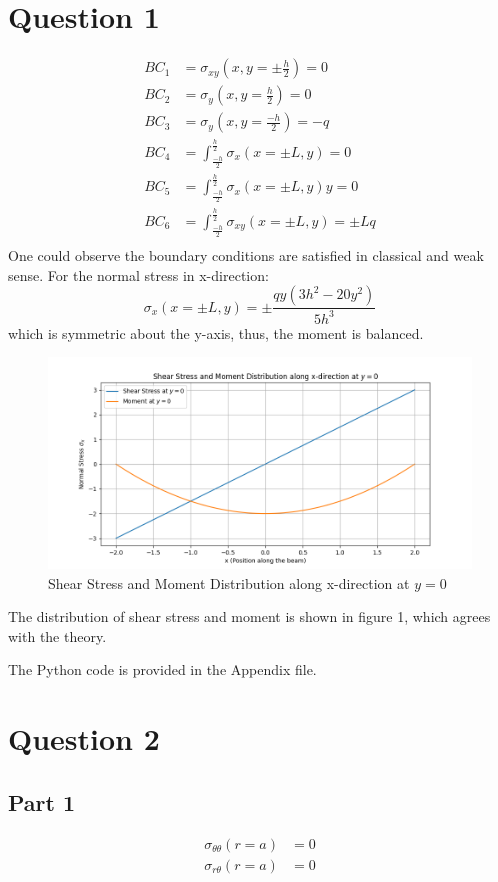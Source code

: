 \documentclass[12pt]{article} %
\begin{document}
\section{Question 1}
\begin{align*}
    BC_1 &= \sigma_{xy}(x,y=\pm \frac{h}{2}) = 0\\
    BC_2 &= \sigma_{y}(x,y=\frac{h}{2}) = 0\\
    BC_3 &= \sigma_{y}(x,y=\frac{-h}{2}) = -q\\
    BC_4 &= \int_{\frac{-h}{2}}^{\frac{h}{2}} \sigma_x(x=\pm L,y) = 0 \\
    BC_5 &= \int_{\frac{-h}{2}}^{\frac{h}{2}} \sigma_x(x=\pm L,y)y = 0 \\
    BC_6 &= \int_{\frac{-h}{2}}^{\frac{h}{2}} \sigma_{xy}(x=\pm L,y) = \pm Lq \\
\end{align*}
One could observe the boundary conditions are satisfied in classical and weak sense. For the normal stress in x-direction:
\[ \sigma_x(x=\pm L,y) = \pm \frac{q y \left(3 h^{2} - 20 y^{2}\right)}{5 h^{3}} \] which is symmetric about the y-axis, thus, the moment is balanced.
\begin{figure}[ht]
    \centering
    \includegraphics[width=1\textwidth]{Q1.png}
    \caption{Shear Stress and Moment Distribution along x-direction at $y=0$}
\end{figure}
The distribution of shear stress and moment is shown in figure 1, which agrees with the theory.

The Python code is provided in the Appendix file.

\section{Question 2}
\subsection*{Part 1}
\begin{align*}
    \sigma_{\theta\theta}(r=a) &= 0\\
    \sigma_{r\theta}(r=a) &= 0\\
\end{align*}
\end{document}
